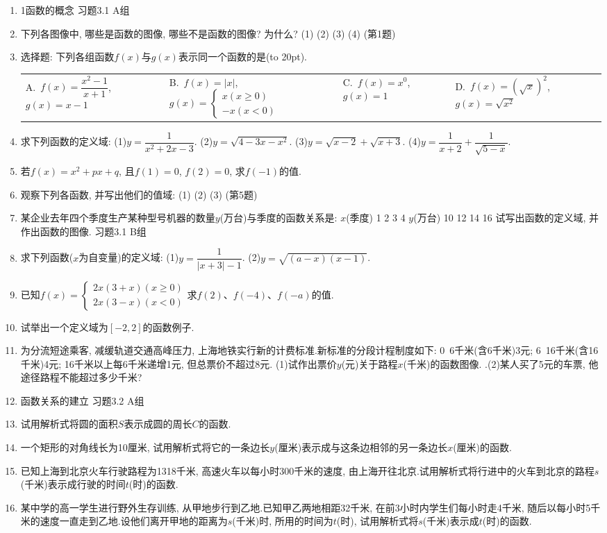\documentclass[10pt,a4paper]{article}
\newcommand{\bracket}[1]{(\hbox to #1pt{})}
\newcommand{\fourch}[4]{\par\begin{tabular}{p{.23\textwidth}p{.23\textwidth}p{.23\textwidth}p{.23\textwidth}}
A.~#1 &B.~#2& C.~#3& D.~#4
\end{tabular}}
\begin{document}
\begin{enumerate}[1.]
\item 1函数的概念
习题3.1  A组
\item 下列各图像中, 哪些是函数的图像, 哪些不是函数的图像? 为什么?
(1)			(2)				(3)			(4)
(第1题)
\item 选择题:
下列各组函数$f(x)$与$g(x)$表示同一个函数的是\bracket{20}.
\fourch{$f(x)=\dfrac{{x^2}-1}{x+1}$, $g(x)=x-1$}{$f(x)=|x|$, $g(x)=\begin{cases} x(x\ge 0) \\ -x(x<0) \end{cases}$}{$f(x)=x^0$, $g(x)=1$}{$f(x)=(\sqrt x)^2$, $g(x)=\sqrt {x^2}$}
\item 求下列函数的定义域:
(1)$y=\dfrac 1{x^2+2x-3}$.						(2)$y=\sqrt {4-3x-x^2}$.
(3)$y=\sqrt {x-2}+\sqrt {x+3}$.					(4)$y=\dfrac 1{x+2}+\dfrac 1{\sqrt {5-x}}$.
\item 若$f(x)=x^2+px+q$, 且$f(1)=0$, $f(2)=0$, 求$f(-1)$的值.
\item 观察下列各函数, 并写出他们的值域:
(1)					(2)					(3)
(第5题)
\item 某企业去年四个季度生产某种型号机器的数量$y$(万台)与季度的函数关系是:
$x$(季度)	1	2	3	4
$y$(万台)	10	12	14	16
试写出函数的定义域, 并作出函数的图像.
习题3.1  B组
\item 求下列函数($x$为自变量)的定义域:
(1)$y=\dfrac 1{|x+3|-1}$.						(2)$y=\sqrt {(a-x)(x-1)}$.
\item 已知$f(x)=\begin{cases} 2x(3+x)(x\ge 0) \\ 2x(3-x)(x<0) \end{cases}$求$f(2)$、$f(-4)$、$f(-a)$的值.
\item 试举出一个定义域为$[-2,2]$的函数例子.
\item 为分流短途乘客, 减缓轨道交通高峰压力, 上海地铁实行新的计费标准.新标准的分段计程制度如下: 0~6千米(含6千米)3元; 6~16千米(含16千米)4元; 16千米以上每6千米递增1元, 但总票价不超过8元.
(1)试作出票价$y$(元)关于路程$x$(千米)的函数图像.
.(2)某人买了5元的车票, 他途径路程不能超过多少千米?
\item 函数关系的建立
习题3.2  A组
\item 试用解析式将圆的面积$S$表示成圆的周长$C$的函数.
\item 一个矩形的对角线长为10厘米, 试用解析式将它的一条边长$y$(厘米)表示成与这条边相邻的另一条边长$x$(厘米)的函数.
\item 已知上海到北京火车行驶路程为1318千米, 高速火车以每小时300千米的速度, 由上海开往北京.试用解析式将行进中的火车到北京的路程$s$(千米)表示成行驶的时间$t$(时)的函数.
\item 某中学的高一学生进行野外生存训练, 从甲地步行到乙地.已知甲乙两地相距32千米, 在前3小时内学生们每小时走4千米, 随后以每小时5千米的速度一直走到乙地.设他们离开甲地的距离为$s$(千米)时, 所用的时间为$t$(时), 试用解析式将$s$(千米)表示成$t$(时)的函数.

\end{enumerate}
\end{document}
